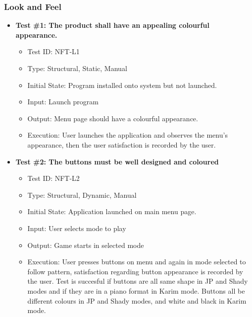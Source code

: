 \documentclass[12pt, titlepage]{article}
\begin{document}
\subsubsection{Look and Feel}
\begin{itemize}
\item \textbf{Test \#1: The product shall have an appealing colourful appearance.}
\begin{itemize}
\item Test ID: NFT-L1
\item Type: Structural, Static, Manual				
\item Initial State: Program installed onto system but not launched.		
\item Input: Launch program
\item Output: Menu page should have a colourful appearance.		
\item Execution: User launches the application and observes the menu's appearance, then the user satisfaction is recorded by the user.
\end{itemize}

\item \textbf{Test \#2: The buttons must be well designed and coloured}
\begin{itemize}
\item Test ID: NFT-L2
\item Type: Structural, Dynamic, Manual			
\item Initial State: Application launched on main menu page.			
\item Input: User selects mode to play			
\item Output: Game starts in selected mode				
\item Execution: User presses buttons on menu and again in mode selected to follow pattern, satisfaction regarding button appearance is recorded by the user. Test is succesful if buttons are all same shape in JP and Shady modes and if they are in a piano format in Karim mode. Buttons all be different colours in JP and Shady modes, and white and black in Karim mode.
\end{itemize}


\end{itemize}
\end{document}

